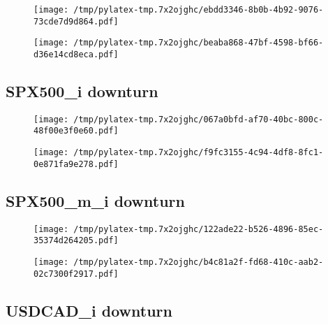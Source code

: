 \documentclass{article}%
\begin{document}
\begin{figure}[htbp]%
\centering%
\texttt{[image: /tmp/pylatex-tmp.7x2ojghc/ebdd3346-8b0b-4b92-9076-73cde7d9d864.pdf]}%
\end{figure}

%


\begin{figure}[htbp]%
\centering%
\texttt{[image: /tmp/pylatex-tmp.7x2ojghc/beaba868-47bf-4598-bf66-d36e14cd8eca.pdf]}%
\end{figure}

%
\newpage %
\subsection{SPX500\_i downturn}%
\label{subsec:SPX500idownturn}%


\begin{figure}[htbp]%
\centering%
\texttt{[image: /tmp/pylatex-tmp.7x2ojghc/067a0bfd-af70-40bc-800c-48f00e3f0e60.pdf]}%
\end{figure}

%


\begin{figure}[htbp]%
\centering%
\texttt{[image: /tmp/pylatex-tmp.7x2ojghc/f9fc3155-4c94-4df8-8fc1-0e871fa9e278.pdf]}%
\end{figure}

%
\newpage %
\subsection{SPX500\_m\_i downturn}%
\label{subsec:SPX500midownturn}%


\begin{figure}[htbp]%
\centering%
\texttt{[image: /tmp/pylatex-tmp.7x2ojghc/122ade22-b526-4896-85ec-35374d264205.pdf]}%
\end{figure}

%


\begin{figure}[htbp]%
\centering%
\texttt{[image: /tmp/pylatex-tmp.7x2ojghc/b4c81a2f-fd68-410c-aab2-02c7300f2917.pdf]}%
\end{figure}

%
\newpage %
\subsection{USDCAD\_i downturn}%
\label{subsec:USDCADidownturn}%
\end{document}
